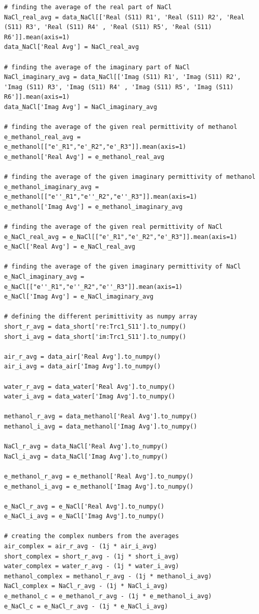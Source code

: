 \documentclass[12pt, a4paper]{article}
\begin{document}
\begin{verbatim}
# finding the average of the real part of NaCl
NaCl_real_avg = data_NaCl[['Real (S11) R1', 'Real (S11) R2', 'Real (S11) R3', 'Real (S11) R4' , 'Real (S11) R5', 'Real (S11) R6']].mean(axis=1)
data_NaCl['Real Avg'] = NaCl_real_avg

# finding the average of the imaginary part of NaCl
NaCl_imaginary_avg = data_NaCl[['Imag (S11) R1', 'Imag (S11) R2', 'Imag (S11) R3', 'Imag (S11) R4' , 'Imag (S11) R5', 'Imag (S11) R6']].mean(axis=1)
data_NaCl['Imag Avg'] = NaCl_imaginary_avg

# finding the average of the given real permittivity of methanol
e_methanol_real_avg = e_methanol[["e'_R1","e'_R2","e'_R3"]].mean(axis=1)
e_methanol['Real Avg'] = e_methanol_real_avg

# finding the average of the given imaginary permittivity of methanol
e_methanol_imaginary_avg = e_methanol[["e''_R1","e''_R2","e''_R3"]].mean(axis=1)
e_methanol['Imag Avg'] = e_methanol_imaginary_avg

# finding the average of the given real permittivity of NaCl
e_NaCl_real_avg = e_NaCl[["e'_R1","e'_R2","e'_R3"]].mean(axis=1)
e_NaCl['Real Avg'] = e_NaCl_real_avg

# finding the average of the given imaginary permittivity of NaCl
e_NaCl_imaginary_avg = e_NaCl[["e''_R1","e''_R2","e''_R3"]].mean(axis=1)
e_NaCl['Imag Avg'] = e_NaCl_imaginary_avg

# defining the different perimittivity as numpy array
short_r_avg = data_short['re:Trc1_S11'].to_numpy()
short_i_avg = data_short['im:Trc1_S11'].to_numpy()

air_r_avg = data_air['Real Avg'].to_numpy()
air_i_avg = data_air['Imag Avg'].to_numpy()

water_r_avg = data_water['Real Avg'].to_numpy()
water_i_avg = data_water['Imag Avg'].to_numpy()

methanol_r_avg = data_methanol['Real Avg'].to_numpy()
methanol_i_avg = data_methanol['Imag Avg'].to_numpy()

NaCl_r_avg = data_NaCl['Real Avg'].to_numpy()
NaCl_i_avg = data_NaCl['Imag Avg'].to_numpy()

e_methanol_r_avg = e_methanol['Real Avg'].to_numpy()
e_methanol_i_avg = e_methanol['Imag Avg'].to_numpy()

e_NaCl_r_avg = e_NaCl['Real Avg'].to_numpy()
e_NaCl_i_avg = e_NaCl['Imag Avg'].to_numpy()

# creating the complex numbers from the averages
air_complex = air_r_avg - (1j * air_i_avg)
short_complex = short_r_avg - (1j * short_i_avg)
water_complex = water_r_avg - (1j * water_i_avg)
methanol_complex = methanol_r_avg - (1j * methanol_i_avg)
NaCl_complex = NaCl_r_avg - (1j * NaCl_i_avg)
e_methanol_c = e_methanol_r_avg - (1j * e_methanol_i_avg)
e_NaCl_c = e_NaCl_r_avg - (1j * e_NaCl_i_avg)


\end{verbatim}
\end{document}
